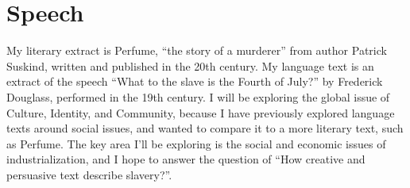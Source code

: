 \documentclass[a4paper,12pt]{article}
\begin{document}
\newpage
\section{Speech}
My literary extract is Perfume, ``the story of a murderer'' from author Patrick Suskind, written and published in the 20th century. My language text is an extract of the speech ``What to the slave is the Fourth of July?'' by Frederick Douglass, performed in the 19th century. I will be exploring the global issue of Culture, Identity, and Community, because I have previously explored language texts around social issues, and wanted to compare it to a more literary text, such as Perfume. The key area I'll be exploring is the social and economic issues of industrialization, and I hope to answer the question of ``How creative and persuasive text describe slavery?''.
\end{document}
